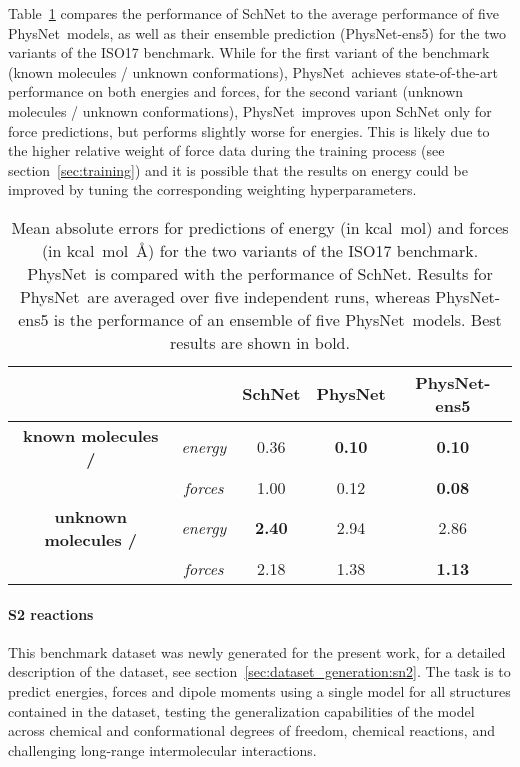 \documentclass[12pt]{article}
\newcommand{\nn}{PhysNet}
\begin{document}
Table~\ref{tab:iso17_results} compares the performance of
SchNet\cite{schutt2017schnet} to the average performance of five
\nn\ models, as well as their ensemble
prediction\cite{breiman1996bagging} (\nn-ens5) for the two variants of
the ISO17 benchmark. While for the first variant of the benchmark
(known molecules / unknown conformations), \nn\ achieves
state-of-the-art performance on both energies and forces, for the
second variant (unknown molecules / unknown conformations),
\nn\ improves upon SchNet only for force predictions, but performs
slightly worse for energies. This is likely due to the higher relative
weight of force data during the training process (see
section~\ref{sec:training}) and it is possible that the results on
energy could be improved by tuning the corresponding weighting
hyperparameters.

\begin{table}[htbp]
\caption{Mean absolute errors for predictions of energy (in
  kcal~mol) and forces (in kcal~mol~\AA) for the
  two variants of the ISO17 benchmark. \nn\ is compared with the
  performance of SchNet.\cite{schutt2017schnet} Results for \nn\ are
  averaged over five independent runs, whereas \nn-ens5 is the
  performance of an ensemble\cite{breiman1996bagging} of five
  \nn\ models. Best results are shown in bold.}
\label{tab:iso17_results}
\centering
	\begin{tabular}{c c c c c}
	\toprule
	& & 
	\textbf{SchNet}\cite{schutt2017schnet} &
	\textbf{\nn} &
	\textbf{\nn-ens5}\\
	\midrule
	
	{\bf known molecules /} & \textit{energy}& 0.36 & \bf 0.10 & \bf 0.10 \\
	\addlinespace[1pt]
	{\bf unknown conformations  } & \textit{forces} & 1.00 & 0.12 & \bf 0.08 \\
	\midrule
	
	{\bf unknown molecules /} & \textit{energy} & \bf 2.40 & 2.94 & 2.86\\
	\addlinespace[1pt]
	{\bf unknown conformations} 	& \textit{forces} & 2.18 & 1.38 & \bf 1.13 \\
	\bottomrule
\end{tabular}
\end{table}

\paragraph{S2 reactions}
This benchmark dataset was newly generated for the present work, for a
detailed description of the dataset, see
section~\ref{sec:dataset_generation:sn2}. The task is to predict
energies, forces and dipole moments using a single model for all
structures contained in the dataset, testing the generalization
capabilities of the model across chemical and conformational degrees
of freedom, chemical reactions, and challenging long-range
intermolecular interactions.
\end{document}
